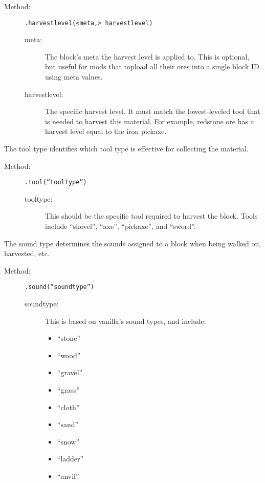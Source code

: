 \documentclass[letterpaper,titlepage,12pt]{article}
\begin{document}
\begin{description}
\item[Method:] \texttt{.harvestlevel(<meta,> harvestlevel)}
\begin{description}
\item [meta:] The block's meta the harvest level is applied to.  This is optional, but useful for mods that topload all their ores into a single block ID using meta values.
\item [harvestlevel:] The specific harvest level.  It must match the lowest-leveled tool that is needed to harvest this material.  For example, redstone ore has a harvest level equal to the iron pickaxe.
\end{description}
\end{description}

The tool type identifies which tool type is effective for collecting the material. 

\begin{description}
\item[Method:] \texttt{.tool(``tooltype'')}
\begin{description}
\item [tooltype:] This should be the specific tool required to harvest the block.  Tools include ``shovel'', ``axe'', ``pickaxe'', and ``sword''.
\end{description}
\end{description}

The sound type determines the sounds assigned to a block when being walked on, harvested, etc.  

\begin{description}
\item[Method:] \texttt{.sound(``soundtype'')}
\begin{description}
\item [soundtype:] This is based on vanilla's sound types, and include:
\begin{multicols}{3}
\begin{itemize}
\item ``stone''
\item ``wood''
\item ``gravel''
\item ``grass''
\item ``cloth''
\item ``sand''
\item ``snow''
\item ``ladder''
\item ``anvil''
\end{itemize}
\end{multicols}
\end{description}
\end{description}
\end{document}
